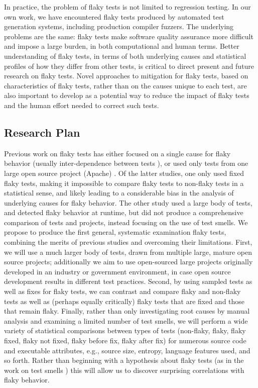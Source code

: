 \documentclass[10pt]{article}
\begin{document}
In practice, the problem of flaky tests is not limited to regression testing.  In our own work, we have encountered flaky tests produced by automated test generation systems, including production compiler fuzzers.  The underlying problems are the same:  flaky tests make software quality assurance more difficult and impose a large burden, in both computational and human terms.  Better understanding of flaky tests, in terms of both underlying causes and statistical profiles of how they differ from other tests, is critical to direct present and future research on flaky tests.  Novel approaches to mitigation for flaky tests, based on characteristics of flaky tests, rather than on the causes unique to each test, are also important to develop as a potential way to reduce the impact of flaky tests and the human effort needed to correct such tests.

\subsection{Research Plan}

 Previous work on flaky tests has either focused on a single cause for flaky behavior (usually inter-dependence between tests \cite{LamZE2015}), or used only tests from one large open source project (Apache) \cite{luo2014empirical,palomba2017does}.  Of the latter studies, one \cite{luo2014empirical} only used fixed flaky tests, making it impossible to compare flaky tests to non-flaky tests in a statistical sense, and likely leading to a considerable bias in the analysis of underlying causes for flaky behavior.  The other study \cite{palomba2017does} used a large body of tests, and detected flaky behavior at runtime, but did not produce a comprehensive comparison of tests and projects, instead focusing on the use of test smells.  We propose to produce the first general, systematic examination flaky tests, combining the merits of previous studies and overcoming their limitations.  First, we will use a much larger body of tests, drawn from multiple large, mature open source projects; additionally we aim to use open-sourced large projects originally developed in an industry or government environment, in case open source development results in different test practices.  Second, by using sampled tests as well as fixes for flaky tests, we can contrast and compare flaky and non-flaky tests as well as (perhaps equally critically) flaky tests that are fixed and those that remain flaky.  Finally, rather than only investigating root causes by manual analysis and examining a limited number of test smells, we will perform a wide variety of statistical comparisons between types of tests (non-flaky, flaky, flaky fixed, flaky not fixed, flaky before fix, flaky after fix) for numerous source code and executable attributes, e.g., source size, entropy, language features used, and so forth.  Rather than beginning with a hypothesis about flaky tests (as in the work on test smells \cite{palomba2017does}) this will allow us to discover surprising correlations with flaky behavior.
\end{document}
